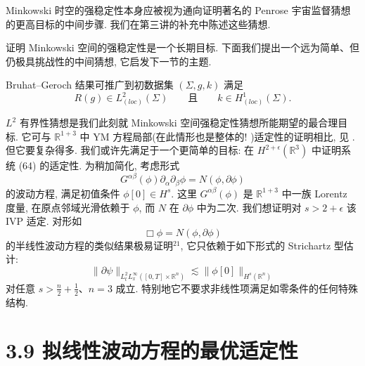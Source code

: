 \setcounter{mtthm}{7}
\begin{remark}\label{rem:3.8}
Minkowski 时空的强稳定性本身应被视为通向证明著名的 Penrose 宇宙监督猜想的更高目标的中间步骤. 我们在第三讲的补充中陈述这些猜想.\end{remark}

证明 Minkowski 空间的强稳定性是一个长期目标. 下面我们提出一个远为简单、但仍极具挑战性的中间猜想, 它启发下一节的主题.
\begin{theorem*}[有限 $L^{2}$ 曲率猜想]
Bruhat--Geroch 结果可推广到初数据集 $(\Sigma, g, k)$ 满足
\[
R(g)\in L^{2}_{(loc)}(\Sigma)\qquad \text{且}\qquad k\in H^{1}_{(loc)}(\Sigma).
\]
\end{theorem*}

$L^2$ 有界性猜想是我们此刻就 Minkowski 空间强稳定性猜想所能期望的最合理目标. 它可与 $\mathbb{R}^{1+3}$ 中 YM 方程局部(在此情形也是整体的! )适定性的证明相比, 见 \cite{klai34}. 但它要复杂得多. 我们或许先满足于一个更简单的目标: 在 $H^{2+\epsilon}(\mathbb{R}^3)$ 中证明系统 (64) 的适定性. 为稍加简化, 考虑形式
\[
G^{\alpha\beta}(\phi)\partial_{\alpha}\partial_{\beta}\phi=N(\phi,\partial\phi)
\]
的波动方程, 满足初值条件 $\phi[0] \in H^s$. 这里 $G^{\alpha\beta}(\phi)$ 是 $\mathbb{R}^{1+3}$ 中一族 Lorentz 度量, 在原点邻域光滑依赖于 $\phi$, 而 $N$ 在 $\partial\phi$ 中为二次. 我们想证明对 $s > 2 + \epsilon$ 该 IVP 适定. 对形如
\[
\Box\phi=N(\phi,\partial\phi)
\]
的半线性波动方程的类似结果极易证明$^{21}$, 它只依赖于如下形式的 Strichartz 型估计:
\[
\|\partial\psi\|_{L_{t}^{2}L_{x}^{\infty}([0,T]\times\mathbb{R}^{n})}\lesssim\|\phi[0]\|_{H^{s}(\mathbb{R}^{n})}
\]
对任意 $s > \frac{n}{2} + \frac{1}{2}$、$n = 3$ 成立. 特别地它不要求非线性项满足如零条件的任何特殊结构.
\section*{3.9 拟线性波动方程的最优适定性}

